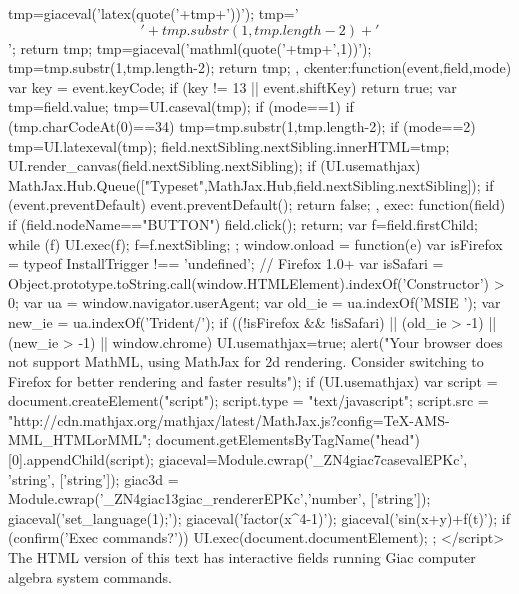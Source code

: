{{{{{       tmp=giaceval('latex(quote('+tmp+'))');
       tmp='$$'+tmp.substr(1,tmp.length-2)+'$$';
       return tmp;
     }
     tmp=giaceval('mathml(quote('+tmp+',1))');
     tmp=tmp.substr(1,tmp.length-2);
    return tmp;   
  },
  ckenter:function(event,field,mode){
    var key = event.keyCode;
    if (key != 13 || event.shiftKey) return true;
    var tmp=field.value;
    tmp=UI.caseval(tmp);
    if (mode==1){
      if (tmp.charCodeAt(0)==34) tmp=tmp.substr(1,tmp.length-2); 
   }
   if (mode==2){
     tmp=UI.latexeval(tmp);
   }
   field.nextSibling.nextSibling.innerHTML=tmp;
   UI.render_canvas(field.nextSibling.nextSibling);
   if (UI.usemathjax) MathJax.Hub.Queue(["Typeset",MathJax.Hub,field.nextSibling.nextSibling]);
   if (event.preventDefault) event.preventDefault();
    return false;
  },
  exec: function(field){
     if (field.nodeName=="BUTTON"){
        field.click();
        return;
     }
     var f=field.firstChild;
     while (f){
       UI.exec(f);
       f=f.nextSibling;
     }
   }
 };
 window.onload = function(e){
   var isFirefox = typeof InstallTrigger !== 'undefined';   // Firefox 1.0+
   var isSafari = Object.prototype.toString.call(window.HTMLElement).indexOf('Constructor') > 0;
  var ua = window.navigator.userAgent;
  var old_ie = ua.indexOf('MSIE ');
  var new_ie = ua.indexOf('Trident/');
  if ((!isFirefox && !isSafari) || (old_ie > -1) || (new_ie > -1) || window.chrome){
     UI.usemathjax=true;
     alert("Your browser does not support MathML, using MathJax for 2d rendering. Consider switching to Firefox for better rendering and faster results");
  }
  if (UI.usemathjax){
    var script = document.createElement("script");
    script.type = "text/javascript";
    script.src  = "http://cdn.mathjax.org/mathjax/latest/MathJax.js?config=TeX-AMS-MML_HTMLorMML";
    document.getElementsByTagName("head")[0].appendChild(script);
  }
  giaceval=Module.cwrap('_ZN4giac7casevalEPKc',  'string', ['string']);
  giac3d = Module.cwrap('_ZN4giac13giac_rendererEPKc','number', ['string']);
  giaceval('set_language(1);');
  giaceval('factor(x^4-1)');
  giaceval('sin(x+y)+f(t)');
 if (confirm('Exec commands?')) UI.exec(document.documentElement);
 };
</script>
}
\else
The HTML version of this text has interactive fields running Giac
computer algebra system commands.
\fi
}
\ifhevea
\newenvironment{giacprog}{
\verbatim}
{\endverbatim 
\@print{<button onclick="var field=parentNode.previousSibling; var tmp=field.innerHTML;if(tmp.length==0) tmp=field.value;var t=createElement('TEXTAREA');t.style.fontSize=16;t.cols=60;t.rows=10;t.value=tmp;tmp=UI.caseval(tmp);if (tmp.charCodeAt(0)==34) tmp=tmp.substr(1,tmp.length-2);nextSibling.innerHTML=tmp; UI.render_canvas(nextSibling.innerHTML); field.parentNode.insertBefore(t,field);field.parentNode.removeChild(field);">ok</button><span></span><br>
}
}
\else
\newenvironment{giacprog}
{
\VerbatimEnvironment
\begin{Verbatim}
}
{
\end{Verbatim}
}
\fi

